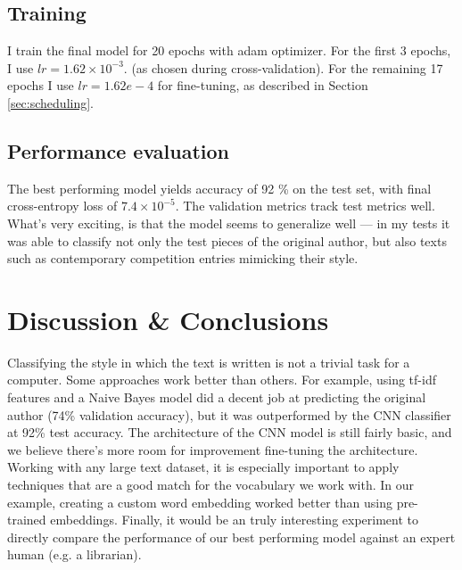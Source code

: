 \documentclass[journal,12pt,onecolumn]{IEEEtran}
\begin{document}
\subsection{Training}
I train the final model for 20 epochs with adam optimizer. For the first 3 epochs, I use $lr = 1.62 \times 10^{-3}$. (as chosen during cross-validation). For the remaining 17 epochs I use $lr=1.62e-4$ for fine-tuning, as described in Section \ref{sec:scheduling}.

\subsection{Performance evaluation}
The best performing model yields accuracy of 92 \% on the test set, with final cross-entropy loss of $7.4 \times 10^{-5}$. The validation metrics track test metrics well. What's very exciting, is that the model seems to generalize well --- in my tests it was able to classify not only the test pieces of the original author, but also texts such as contemporary competition entries mimicking their style.

\FloatBarrier

\section{Discussion \& Conclusions}

Classifying the style in which the text is written is not a trivial task for a computer. Some approaches work better than others. For example, using tf-idf features and a Naive Bayes model did a decent job at predicting the original author (74\% validation accuracy), but it was outperformed by the CNN classifier at 92\% test accuracy. The architecture of the CNN model is still fairly basic, and we believe there's more room for improvement fine-tuning the architecture. Working with any large text dataset, it is especially important to apply techniques that are a good match for the vocabulary we work with. In our example, creating a custom word embedding worked better than using pre-trained embeddings. Finally, it would be an truly interesting experiment to directly compare the performance of our best performing model against an expert human (e.g. a librarian).


\end{document}
